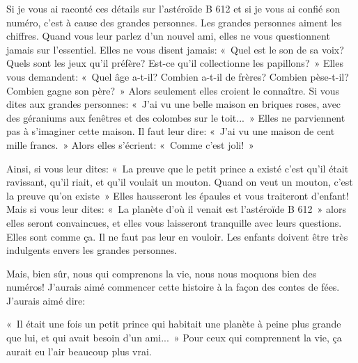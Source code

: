 \documentclass[a4paper]{report}
\begin{document}
Si je vous ai raconté ces détails sur l'astéroïde B 612 et si je vous ai confié son numéro, c'est à cause des grandes personnes. Les grandes personnes aiment les chiffres. Quand vous leur parlez d'un nouvel ami, elles ne vous questionnent jamais sur l'essentiel. Elles ne vous disent jamais: «~Quel est le son de sa voix? Quels sont les jeux qu'il préfère? Est-ce qu'il collectionne les papillons?~» Elles vous demandent: «~Quel âge a-t-il? Combien a-t-il de frères? Combien pèse-t-il? Combien gagne son père?~» Alors seulement elles croient le connaître. Si vous dites aux grandes personnes: «~J'ai vu une belle maison en briques roses, avec des géraniums aux fenêtres et des colombes sur le toit...~» Elles ne parviennent pas à s'imaginer cette maison. Il faut leur dire: «~J'ai vu une maison de cent mille francs.~» Alors elles s'écrient: «~Comme c'est joli!~»

Ainsi, si vous leur dites: «~La preuve que le petit prince a existé c'est qu'il était ravissant, qu'il riait, et qu'il voulait un mouton. Quand on veut un mouton, c'est la preuve qu'on existe~» Elles hausseront les épaules et vous traiteront d'enfant! Mais si vous leur dites: «~La planète d'où il venait est l'astéroïde B 612~» alors elles seront convaincues, et elles vous laisseront tranquille avec leurs questions. Elles sont comme ça. Il ne faut pas leur en vouloir. Les enfants doivent être très indulgents envers les grandes personnes.

Mais, bien sûr, nous qui comprenons la vie, nous nous moquons bien des numéros! J'aurais aimé commencer cette histoire à la façon des contes de fées. J'aurais aimé dire:

«~Il était une fois un petit prince qui habitait une planète à peine plus grande que lui, et qui avait besoin d'un ami...~» Pour ceux qui comprennent la vie, ça aurait eu l'air beaucoup plus vrai.
\end{document}
